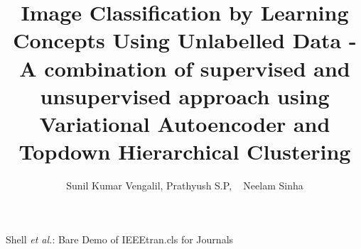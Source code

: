 \documentclass[journal]{IEEEtran}
\begin{document}
%
\title{ Image Classification by Learning Concepts Using Unlabelled Data  - A combination of supervised and unsupervised approach using Variational Autoencoder and Topdown Hierarchical Clustering}
%
%
%

\author{Sunil Kumar Vengalil, Prathyush S.P, ~\IEEEmembership
        Neelam Sinha }


% 
%



%
{Shell \MakeLowercase{\textit{et al.}}: Bare Demo of IEEEtran.cls for Journals}
% 
\end{document}
